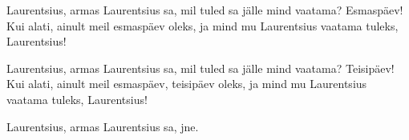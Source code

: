 Laurentsius, armas Laurentsius sa,
mil tuled sa j\"alle mind vaatama?
Esmasp\"aev!
Kui alati, ainult meil esmasp\"aev oleks,
ja mind mu Laurentsius vaatama tuleks,
Laurentsius!

Laurentsius, armas Laurentsius sa,
mil tuled sa j\"alle mind vaatama?
Teisip\"aev!
Kui alati, ainult meil esmasp\"aev, teisip\"aev oleks,
ja mind mu Laurentsius vaatama tuleks,
Laurentsius!

Laurentsius, armas Laurentsius sa, jne.